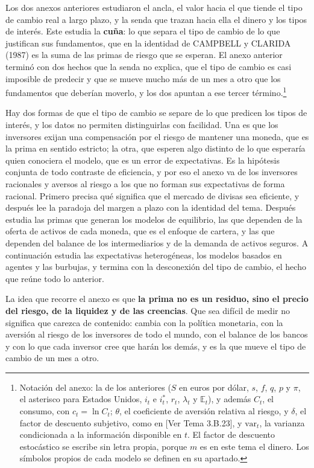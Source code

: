 \documentclass[10pt,a4paper]{article}
\newcommand{\authorfont}[1]{{\fontfamily{EBGaramond-TLF}\selectfont #1}}
\newcounter{anexo}
\begin{document}
Los dos anexos anteriores estudiaron el ancla, el valor hacia el que tiende el tipo de cambio real a largo plazo, y la senda que trazan hacia ella el dinero y los tipos de interés. Este estudia la \textbf{cuña}: lo que separa el tipo de cambio de lo que justifican sus fundamentos, que en la identidad de CAMPBELL y CLARIDA (1987) es la suma de las primas de riesgo que se esperan. El anexo anterior terminó con dos hechos que la senda no explica, que el tipo de cambio es casi imposible de predecir y que se mueve mucho más de un mes a otro que los fundamentos que deberían moverlo, y los dos apuntan a ese tercer término.\footnote{%
    Notación del anexo: la de los anteriores ($S$ en euros por dólar, $s$, $f$, $q$, $p$ y $\pi$, el asterisco para Estados Unidos, $i_t$ e $i_t^*$, $r_t$, $\lambda_t$ y $\mathbb{E}_t$), y además $C_t$, el consumo, con $c_t=\ln C_t$; $\theta$, el coeficiente de aversión relativa al riesgo, y $\delta$, el factor de descuento subjetivo, como en [\authorfont{Ver Tema 3.B.23}], y $\mathrm{var}_t$, la varianza condicionada a la información disponible en $t$. El factor de descuento estocástico se escribe sin letra propia, porque $m$ es en este tema el dinero. Los símbolos propios de cada modelo se definen en su apartado.
}

Hay dos formas de que el tipo de cambio se separe de lo que predicen los tipos de interés, y los datos no permiten distinguirlas con facilidad. Una es que los inversores exijan una compensación por el riesgo de mantener una moneda, que es la prima en sentido estricto; la otra, que esperen algo distinto de lo que esperaría quien conociera el modelo, que es un error de expectativas. Es la hipótesis conjunta de todo contraste de eficiencia, y por eso el anexo va de los inversores racionales y aversos al riesgo a los que no forman sus expectativas de forma racional. Primero precisa qué significa que el mercado de divisas sea eficiente, y después lee la paradoja del margen a plazo con la identidad del tema. Después estudia las primas que generan los modelos de equilibrio, las que dependen de la oferta de activos de cada moneda, que es el enfoque de cartera, y las que dependen del balance de los intermediarios y de la demanda de activos seguros. A continuación estudia las expectativas heterogéneas, los modelos basados en agentes y las burbujas, y termina con la desconexión del tipo de cambio, el hecho que reúne todo lo anterior.

La idea que recorre el anexo es que \textbf{la prima no es un residuo, sino el precio del riesgo, de la liquidez y de las creencias}. Que sea difícil de medir no significa que carezca de contenido: cambia con la política monetaria, con la aversión al riesgo de los inversores de todo el mundo, con el balance de los bancos y con lo que cada inversor cree que harán los demás, y es la que mueve el tipo de cambio de un mes a otro.
\end{document}
